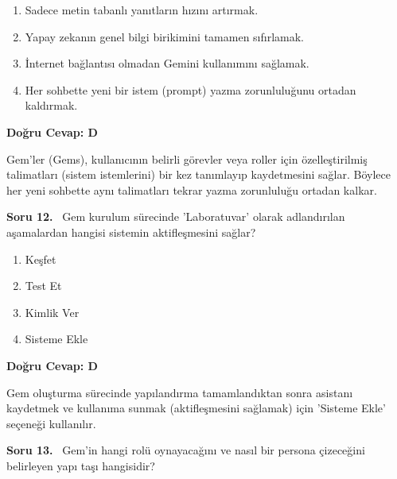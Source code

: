 \documentclass[11pt,a4paper,openany]{book}
\begin{document}
\begin{enumerate}[label=\Alph*), leftmargin=25pt, topsep=4pt, itemsep=2pt]
        \item Sadece metin tabanlı yanıtların hızını artırmak.
        \item Yapay zekanın genel bilgi birikimini tamamen sıfırlamak.
        \item İnternet bağlantısı olmadan Gemini kullanımını sağlamak.
        \item Her sohbette yeni bir istem (prompt) yazma zorunluluğunu ortadan kaldırmak.
\end{enumerate}

\vspace{4pt}
\begin{tcolorbox}[title=Cevap ve Açıklama, colback=gray!3!white, colframe=primarycolor!90!black, arc=2mm, fonttitle=\bfseries\sffamily, top=6pt, bottom=6pt]
    \textbf{Doğru Cevap: D}
    
    \vspace{2pt}
    Gem'ler (Gems), kullanıcının belirli görevler veya roller için özelleştirilmiş talimatları (sistem istemlerini) bir kez tanımlayıp kaydetmesini sağlar. Böylece her yeni sohbette aynı talimatları tekrar yazma zorunluluğu ortadan kalkar.
\end{tcolorbox}
\vspace{10pt}
\needspace{5cm}
\vspace{8pt}
\noindent\textbf{\large\sffamily Soru 12.} \ Gem kurulum sürecinde 'Laboratuvar' olarak adlandırılan aşamalardan hangisi sistemin aktifleşmesini sağlar?

\begin{enumerate}[label=\Alph*), leftmargin=25pt, topsep=4pt, itemsep=2pt]
        \item Keşfet
        \item Test Et
        \item Kimlik Ver
        \item Sisteme Ekle
\end{enumerate}

\vspace{4pt}
\begin{tcolorbox}[title=Cevap ve Açıklama, colback=gray!3!white, colframe=primarycolor!90!black, arc=2mm, fonttitle=\bfseries\sffamily, top=6pt, bottom=6pt]
    \textbf{Doğru Cevap: D}

    \vspace{2pt}
    Gem oluşturma sürecinde yapılandırma tamamlandıktan sonra asistanı kaydetmek ve kullanıma sunmak (aktifleşmesini sağlamak) için 'Sisteme Ekle' seçeneği kullanılır.
\end{tcolorbox}
\vspace{10pt}
\needspace{5cm}
\vspace{8pt}
\noindent\textbf{\large\sffamily Soru 13.} \ Gem'in hangi rolü oynayacağını ve nasıl bir persona çizeceğini belirleyen yapı taşı hangisidir?
\end{document}
